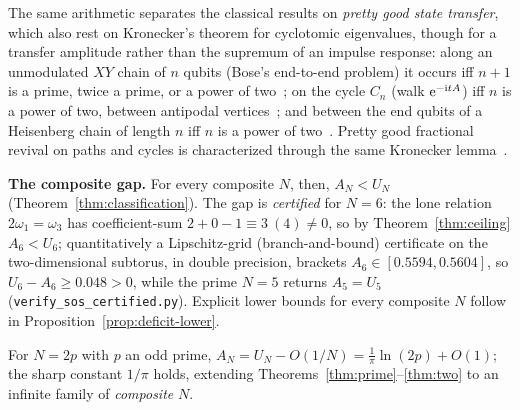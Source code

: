 \noindent The same arithmetic separates the classical results on \emph{pretty good state transfer}, which also
rest on Kronecker's theorem for cyclotomic eigenvalues, though for a transfer amplitude rather than the
supremum of an impulse response: along an unmodulated $XY$ chain of $n$ qubits (Bose's end-to-end problem)
it occurs iff $n+1$ is a prime, twice a prime, or a power of two~\cite{GKSS12}; on the cycle $C_n$ (walk
$\mathrm{e}^{-\mathrm itA}$) iff $n$ is a power of two, between antipodal vertices~\cite{PB17}; and between the end
qubits of a Heisenberg chain of length $n$ iff $n$ is a power of two~\cite{BCGS17}. Pretty good fractional
revival on paths and cycles is characterized through the same Kronecker lemma~\cite{ChanPGFR21}.

\medskip\noindent\textbf{The composite gap.} For every composite $N$, then, $A_N<U_N$
(Theorem~\ref{thm:classification}). The gap is
\emph{certified} for $N=6$: the lone relation $2\omega_1=\omega_3$ has coefficient-sum
$2+0-1\equiv3\ (4)\ne0$, so by Theorem~\ref{thm:ceiling} $A_6<U_6$; quantitatively a Lipschitz-grid
(branch-and-bound) certificate on the two-dimensional subtorus, in double precision, brackets
$A_6\in[0.5594,0.5604]$, so $U_6-A_6\ge0.048>0$, while the prime
$N=5$ returns $A_5=U_5$ (\texttt{verify\_sos\_certified.py}). Explicit lower bounds for every composite $N$
follow in Proposition~\ref{prop:deficit-lower}.

\begin{proposition}\label{prop:2p}
For $N=2p$ with $p$ an odd prime, $A_N=U_N-O(1/N)=\tfrac1\pi\ln(2p)+O(1)$; the sharp constant $1/\pi$
holds, extending Theorems~\ref{thm:prime}--\ref{thm:two} to an infinite family of \emph{composite} $N$.
\end{proposition}

